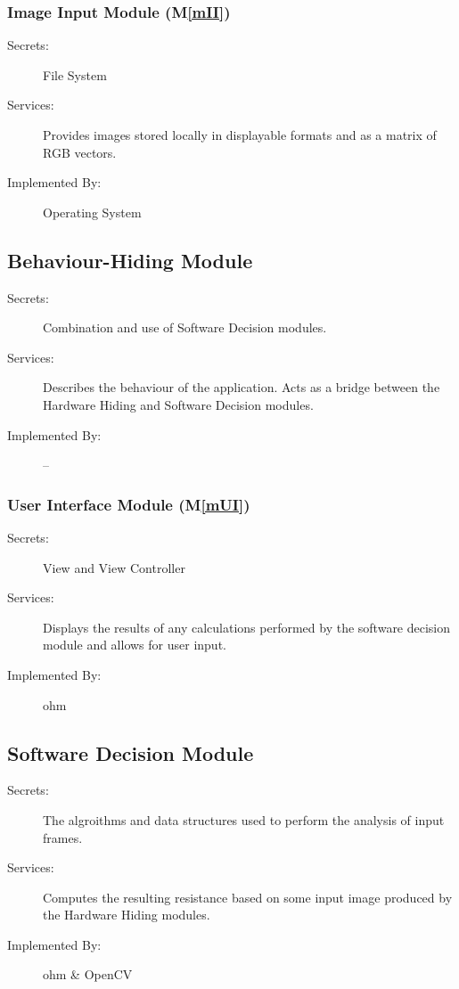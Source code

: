 \documentclass[12pt, titlepage]{article}
\newcommand{\mref}[1]{M\ref{#1}}
\begin{document}
\subsubsection{Image Input Module (\mref{mII})}
\begin{description}
\item[Secrets:] File System
\item[Services:] Provides images stored locally in displayable formats and as a matrix of RGB vectors.
\item[Implemented By:] Operating System
\end{description}

\subsection{Behaviour-Hiding Module}

\begin{description}
\item[Secrets:]  Combination and use of Software Decision modules.
\item[Services:] Describes the behaviour of the application. Acts as a bridge between the Hardware Hiding and Software Decision modules.
\item[Implemented By:] --
\end{description}

\subsubsection{User Interface Module (\mref{mUI})}

\begin{description}
\item[Secrets:] View and View Controller
\item[Services:] Displays the results of any calculations performed by the software decision module and allows for user input.
\item[Implemented By:] ohm
\end{description}

\subsection{Software Decision Module}

\begin{description}
\item[Secrets:] The algroithms and data structures used to perform the analysis of input frames.
\item[Services:] Computes the resulting resistance based on some input image produced by the Hardware Hiding modules.
\item[Implemented By:] ohm \& OpenCV
\end{description}
\end{document}
